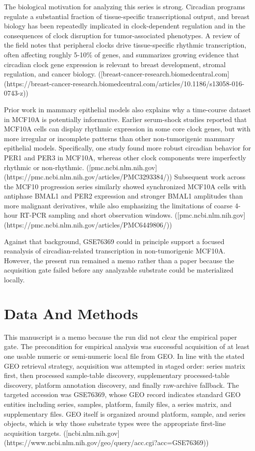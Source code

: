 \documentclass[11pt]{article}
\begin{document}
The biological motivation for analyzing this series is strong. Circadian programs regulate a substantial fraction of tissue-specific transcriptional output, and breast biology has been repeatedly implicated in clock-dependent regulation and in the consequences of clock disruption for tumor-associated phenotypes. A review of the field notes that peripheral clocks drive tissue-specific rhythmic transcription, often affecting roughly 5-10\% of genes, and summarizes growing evidence that circadian clock gene expression is relevant to breast development, stromal regulation, and cancer biology. ([breast-cancer-research.biomedcentral.com](https://breast-cancer-research.biomedcentral.com/articles/10.1186/s13058-016-0743-z))

Prior work in mammary epithelial models also explains why a time-course dataset in MCF10A is potentially informative. Earlier serum-shock studies reported that MCF10A cells can display rhythmic expression in some core clock genes, but with more irregular or incomplete patterns than other non-tumorigenic mammary epithelial models. Specifically, one study found more robust circadian behavior for PER1 and PER3 in MCF10A, whereas other clock components were imperfectly rhythmic or non-rhythmic. ([pmc.ncbi.nlm.nih.gov](https://pmc.ncbi.nlm.nih.gov/articles/PMC3293384/)) Subsequent work across the MCF10 progression series similarly showed synchronized MCF10A cells with antiphase BMAL1 and PER2 expression and stronger BMAL1 amplitudes than more malignant derivatives, while also emphasizing the limitations of coarse 4-hour RT-PCR sampling and short observation windows. ([pmc.ncbi.nlm.nih.gov](https://pmc.ncbi.nlm.nih.gov/articles/PMC6449806/))

Against that background, GSE76369 could in principle support a focused reanalysis of circadian-related transcription in non-tumorigenic MCF10A. However, the present run remained a memo rather than a paper because the acquisition gate failed before any analyzable substrate could be materialized locally.

\section{Data And Methods}
This manuscript is a memo because the run did not clear the empirical paper gate. The precondition for empirical analysis was successful acquisition of at least one usable numeric or semi-numeric local file from GEO. In line with the stated GEO retrieval strategy, acquisition was attempted in staged order: series matrix first, then processed sample-table discovery, supplementary processed-table discovery, platform annotation discovery, and finally raw-archive fallback. The targeted accession was GSE76369, whose GEO record indicates standard GEO entities including series, samples, platform, family files, a series matrix, and supplementary files. GEO itself is organized around platform, sample, and series objects, which is why those substrate types were the appropriate first-line acquisition targets. ([ncbi.nlm.nih.gov](https://www.ncbi.nlm.nih.gov/geo/query/acc.cgi?acc=GSE76369))
\end{document}
